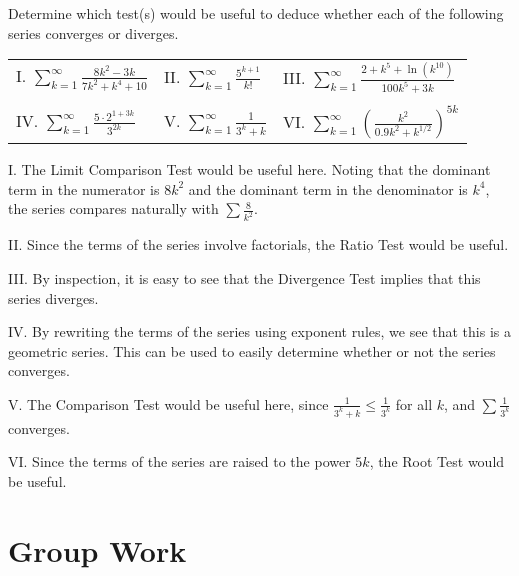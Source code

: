 \documentclass[noauthor]{ximera}
\begin{document}
\begin{problem}
Determine which test(s) would be useful to deduce whether each of the following series converges or diverges.
\begin{center}
\begin{tabular}{lll}
I. $\sum_{k=1}^\infty \frac{8k^2-3k}{7k^2+k^4+10}$ \hspace{.2in} & II. $\sum_{k=1}^\infty \frac{5^{k+1}}{k!}$ \hspace{.2in} & III. $\sum_{k=1}^\infty \frac{2+k^5+\ln(k^{10})}{100k^5+3k}$ \\
&& \\
IV. $\sum_{k=1}^\infty \frac{5\cdot 2^{1+3k}}{3^{2k}}$ \hspace{.2in} & V. $\sum_{k=1}^\infty \frac{1}{3^k + k}$ \hspace{.2in} & VI. $\sum_{k=1}^\infty \left(\frac{k^2}{0.9k^2+k^{1/2}}\right)^{5k}$
\end{tabular}
\end{center}
\begin{freeResponse}
I. The Limit Comparison Test would be useful here. Noting that the dominant term in the numerator is $8k^2$ and the dominant term in the denominator is $k^4$, the series compares naturally with $\sum \frac{8}{k^2}$.

II. Since the terms of the series involve factorials, the Ratio Test would be useful.

III. By inspection, it is easy to see that the Divergence Test implies that this series diverges.

IV. By rewriting the terms of the series using exponent rules, we see that this is a geometric series. This can be used to easily determine whether or not the series converges.

V. The Comparison Test would be useful here, since $\frac{1}{3^k + k} \leq \frac{1}{3^k}$ for all $k$, and $\sum \frac{1}{3^k}$ converges.

VI. Since the terms of the series are raised to the power $5k$, the Root Test would be useful.
\end{freeResponse}
\end{problem}

\section{Group Work}
\end{document}
